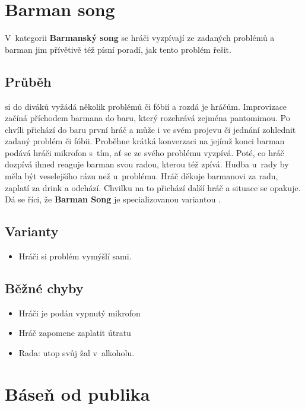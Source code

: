 \needspace{5cm} \section{Barman song} \label{barman song}  
 
V~kategorii \textbf{Barmanský song} se hráči vyzpívají ze zadaných problémů a barman jim přívětivě též písní poradí, jak tento problém řešit.  
 
\subsection{ Průběh }  si do diváků vyžádá několik problémů či fóbií a rozdá je hráčům. Improvizace začíná příchodem barmana do baru, který rozehrává zejména pantomimou. Po chvíli přichází do baru první hráč a může i ve svém projevu či jednání zohlednit zadaný problém či fóbii. Proběhne krátká konverzaci na jejímž konci barman podává hráči mikrofon s~tím, ať se ze svého problému vyzpívá. Poté, co hráč dozpívá ihned reaguje barman svou radou, kterou též zpívá. Hudba u~rady by měla být veselejšího rázu než u~problému. Hráč děkuje barmanovi za radu, zaplatí za drink a odchází. Chvilku na to přichází další hráč a situace se opakuje. 
Dá se říci, že \textbf{Barman Song} je specializovanou variantou . 
 
\subsection{ Varianty } \begin{itemize}
\item Hráči si problém vymýšlí sami.
\end{itemize}
 
 
\subsection{ Běžné chyby} \begin{itemize}
\item  Hráči je podán vypnutý mikrofon
\item  Hráč zapomene zaplatit útratu
\item  Rada: utop svůj žal v~alkoholu.
\end{itemize}
 
 
 
  
  
 
\needspace{5cm} \section{Báseň od publika} \label{báseň od publika}  
 
